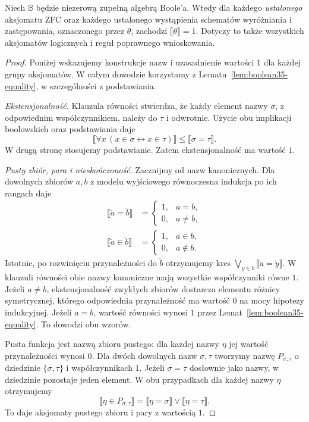 \begin{twierdzenie}
\label{thm:boolean35-zfc}
Niech $\mathbb B$ będzie
niezerową zupełną algebrą Boole'a.
Wtedy dla każdego \emph{ustalonego}
aksjomatu ZFC oraz każdego
ustalonego wystąpienia schematów
wyróżniania i zastępowania,
oznaczonego przez $\theta$,
zachodzi
$\llbracket\theta\rrbracket=1$.
Dotyczy to także wszystkich
aksjomatów logicznych i
reguł poprawnego wnioskowania.
\end{twierdzenie}
\begin{proof}
Poniżej wskazujemy konstrukcje nazw
i uzasadnienie wartości $1$ dla
każdej grupy aksjomatów. W całym
dowodzie korzystamy z
Lematu~\ref{lem:boolean35-equality},
w szczególności z podstawiania.

\emph{Ekstensjonalność.}
Klauzula równości stwierdza, że
każdy element nazwy $\sigma$,
z odpowiednim współczynnikiem,
należy do $\tau$ i odwrotnie.
Użycie obu implikacji boolowskich
oraz podstawiania daje
\[
 \llbracket\forall x\,
 (x\in\sigma\leftrightarrow x\in\tau)
 \rrbracket
 \le\llbracket\sigma=\tau\rrbracket.
\]
W drugą stronę stosujemy podstawianie.
Zatem ekstensjonalność ma wartość $1$.

\emph{Pusty zbiór, para i nieskończoność.}
Zacznijmy od nazw kanonicznych.
Dla dowolnych zbiorów $a,b$
z modelu wyjściowego
równoczesna indukcja po ich
rangach daje
\[
\begin{aligned}
 \llbracket\check a=\check b\rrbracket
 &=\begin{cases}1,&a=b,\\0,&a\ne b,\end{cases}\\
 \llbracket\check a\in\check b\rrbracket
 &=\begin{cases}1,&a\in b,\\0,&a\notin b.\end{cases}
\end{aligned}
\]
Istotnie, po rozwinięciu
przynależności do $\check b$
otrzymujemy kres
$\bigvee_{y\in b}
\llbracket\check a=\check y\rrbracket$.
W klauzuli równości obie
nazwy kanoniczne mają
wszystkie współczynniki
równe $1$. Jeżeli $a\ne b$,
ekstensjonalność zwykłych
zbiorów dostarcza elementu
różnicy symetrycznej, którego
odpowiednia przynależność
ma wartość $0$ na mocy
hipotezy indukcyjnej.
Jeżeli $a=b$, wartość
równości wynosi $1$ przez
Lemat~\ref{lem:boolean35-equality}.
To dowodzi obu wzorów.

Pusta funkcja jest nazwą
zbioru pustego: dla każdej
nazwy $\eta$ jej wartość
przynależności wynosi $0$.
Dla dwóch dowolnych nazw
$\sigma,\tau$ tworzymy
nazwę $P_{\sigma,\tau}$
o dziedzinie
$\{\sigma,\tau\}$ i
współczynnikach $1$.
Jeżeli $\sigma=\tau$
dosłownie jako nazwy,
w dziedzinie pozostaje
jeden element. W obu
przypadkach dla każdej
nazwy $\eta$ otrzymujemy
\[
 \llbracket\eta\in
    P_{\sigma,\tau}\rrbracket
 =\llbracket\eta=\sigma\rrbracket
   \vee\llbracket\eta=\tau\rrbracket.
\]
To daje aksjomaty pustego
zbioru i pary z wartością $1$.


\end{proof}
